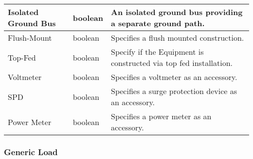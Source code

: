 \documentclass[letterpaper,10pt,english]{sphinxmanual}
\begin{document}
\begin{savenotes}
\begin{tabulary}{\linewidth}[t]{|T|T|T|}
\\
\hline
Isolated Ground Bus
&
boolean
&
An isolated ground bus providing a separate ground path.
\\
\hline
Flush-Mount
&
boolean
&
Specifies a flush mounted construction.
\\
\hline
Top-Fed
&
boolean
&
Specify if the Equipment is constructed via top fed installation.
\\
\hline
Voltmeter
&
boolean
&
Specifies a voltmeter as an accessory.
\\
\hline
SPD
&
boolean
&
Specifies a surge protection device as an accessory.
\\
\hline
Power Meter
&
boolean
&
Specifies a power meter as an accessory.
\\
\hline
\end{tabulary}
\par
\sphinxattableend\end{savenotes}


\subsubsection{Generic Load}
\label{\detokenize{docs/definitions/index-definitions:generic-load}}\label{\detokenize{docs/definitions/index-definitions:generic-load-definition}}
\end{document}
